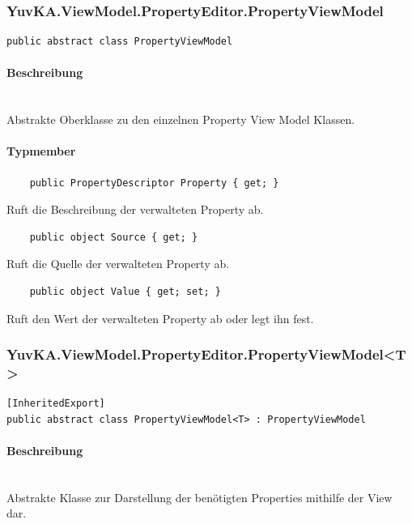 \subsubsection{YuvKA.ViewModel.PropertyEditor.PropertyViewModel}

\begin{verbatim}
public abstract class PropertyViewModel
\end{verbatim}

\paragraph{Beschreibung}~\\
Abstrakte Oberklasse zu den einzelnen Property View Model Klassen.

\paragraph{Typmember}
\begin{itemize}
 	
	\begin{verbatim}
	public PropertyDescriptor Property { get; }
	\end{verbatim}
	Ruft die Beschreibung der verwalteten Property ab.

	\begin{verbatim}
	public object Source { get; }
	\end{verbatim}
	Ruft die Quelle der verwalteten Property ab.

	\begin{verbatim}
	public object Value { get; set; }
	\end{verbatim}
	Ruft den Wert der verwalteten Property ab oder legt ihn fest.

\end{itemize}




\subsubsection{YuvKA.ViewModel.PropertyEditor.PropertyViewModel\textless T\textgreater}

\begin{verbatim}
[InheritedExport]
public abstract class PropertyViewModel<T> : PropertyViewModel
\end{verbatim}

\paragraph{Beschreibung}~\\
Abstrakte Klasse zur Darstellung der benötigten Properties mithilfe der View dar.

